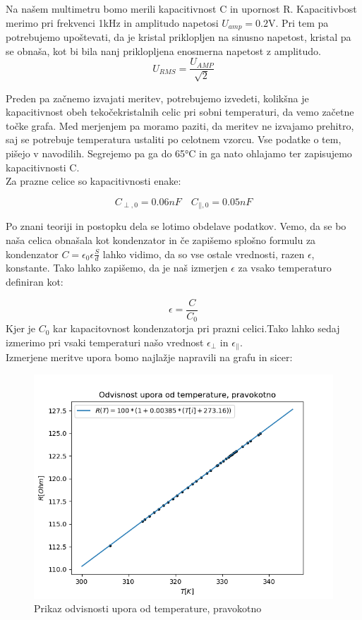 \documentclass[11pt, a4paper]{article}
\theoremstyle{definition}
\theoremstyle{example}
\theoremstyle{izrek}
\begin{document}
Na našem multimetru bomo merili kapacitivnost C in upornost R. Kapacitivbost merimo pri frekvenci 1kHz in amplitudo napetosi $U_{amp}=0.2$V. Pri tem pa potrebujemo upoštevati, da je kristal priklopljen na sinusno napetost, kristal pa se obnaša, kot bi bila nanj priklopljena enosmerna napetost z amplitudo.
\begin{equation}
\label{Sinusna-enosmerna napetost}
U_{RMS}= \frac{U_{AMP}}{\sqrt{2}}
\end{equation}

Preden pa začnemo izvajati meritev, potrebujemo izvedeti, kolikšna je kapacitivnost obeh tekočekristalnih celic pri sobni temperaturi, da vemo začetne točke grafa. Med merjenjem pa moramo paziti, da meritev ne izvajamo prehitro, saj se potrebuje temperatura ustaliti po celotnem vzorcu. Vse podatke o tem, pišejo v navodilih. Segrejemo pa ga do 65°C in ga nato ohlajamo ter zapisujemo kapacitivnosti C. \\

Za prazne celice so kapacitivnosti enake:

\begin{equation}
\label{Kapacitivnosti na praznem}
C_{\perp,0}=0.06nF \quad C_{||,0}=0.05nF
\end{equation}

Po znani teoriji in postopku dela se lotimo obdelave podatkov. 
Vemo, da se bo naša celica obnašala kot kondenzator in če zapišemo splošno formulu za kondenzator $C=\epsilon_0 \epsilon \frac{S}{d}$ lahko vidimo, da so vse ostale vrednosti, razen $\epsilon$, konstante. Tako lahko zapišemo, da je naš izmerjen $\epsilon$ za vsako temperaturo definiran kot:

\begin{equation}
\label{Dielektričnost}
\epsilon=\frac{C}{C_0}
\end{equation}
Kjer je $C_0$ kar kapacitovnost kondenzatorja pri prazni celici.Tako lahko sedaj izmerimo pri vsaki temperaturi našo vrednost $\epsilon_{\perp}$ in $\epsilon_{||}$. \\

Izmerjene meritve upora bomo najlažje napravili na grafu in sicer:

\begin{figure}[H]
	\centering
    \includegraphics[width=12cm]{Upor_temperatura, pravokotno.png}
    \caption{Prikaz odvisnosti upora od temperature, pravokotno}
\end{figure}
\end{document}
